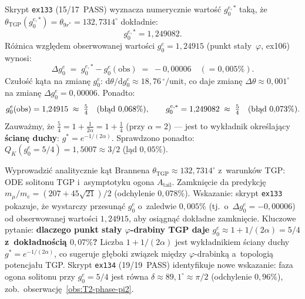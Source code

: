 \begin{observation}\label{obs:T2-top4-g0e-scan}
  Skrypt \texttt{ex133} (15/17~PASS) wyznacza numerycznie warto\'s\'c
  $g_0^{e,*}$ tak\k{a}, \.ze $\theta_{\mathrm{TGP}}(g_0^{e,*}) = \theta_{9r^*}
  = 132{,}7314^\circ$ dok\l{}adnie:
  \begin{equation}\label{eq:T2-g0e-star}
    g_0^{e,*} = 1{,}249082.
  \end{equation}
  R\'o\.znica wzgl\k{e}dem obserwowanej warto\'sci $g_0^e = 1{,}24915$
  (punkt stały~$\varphi$, ex106) wynosi:
  \begin{equation}
    \Delta g_0^e \;=\; g_0^{e,*} - g_0^e(\mathrm{obs}) \;=\; -0{,}00006
    \quad (= 0{,}005\%).
  \end{equation}
  Czu\l{}o\'s\'c k\k{a}ta na zmian\k{e} $g_0^e$:
  $\mathrm{d}\theta/\mathrm{d}g_0^e \approx 18{,}76\,{}^\circ/\mathrm{unit}$,
  co daje zmian\k{e} $\Delta\theta \approx 0{,}001^\circ$ na zmian\k{e}
  $\Delta g_0^e = 0{,}00006$.
  Ponadto:
  \begin{equation}\label{eq:T2-5-4}
    g_0^e(\mathrm{obs}) = 1{,}24915 \;\approx\; \tfrac{5}{4}
    \quad \text{(b\l\k{a}d } 0{,}068\%),
    \qquad
    g_0^{e,*} = 1{,}249082 \;\approx\; \tfrac{5}{4}
    \quad \text{(b\l\k{a}d } 0{,}073\%).
  \end{equation}
  Zauwa\.zmy, \.ze $\tfrac{5}{4} = 1 + \tfrac{1}{2\alpha} = 1 + \tfrac{1}{4}$
  (przy $\alpha=2$) --- jest to wyk\l{}adnik okre\'slaj\k{a}cy \textbf{\'scian\k{e}
  duchy}: $g^* = e^{-1/(2\alpha)}$.
  Sprawdzono ponadto: $Q_K(g_0^e = 5/4) = 1{,}5007 \approx 3/2$ (\b{l}\k{a}d
  $0{,}05\%$).
\end{observation}

\begin{openproblem}[T-OP4]\label{op:T2-top4}
  Wyprowadzi\'c analitycznie k\k{a}t Brannena
  $\theta_{\mathrm{TGP}} \approx 132{,}7314^\circ$
  z~warunk\'ow TGP: ODE solitonu TGP
  i~asymptotyku ogona $A_{\mathrm{tail}}$.
  Zamkni\k{e}cie da predykcj\k{e}
  $m_\mu/m_e = (207+45\sqrt{21})/2$ (od\-chylenie $0{,}078\%$).
  Wskazanie: skrypt \texttt{ex133} pokazuje, \.ze wystarczy
  przesun\k{a}\'c $g_0^e$ o~zaledwie $0{,}005\%$ (tj.\ o~$\Delta g_0^e =
  -0{,}00006$) od obserwowanej warto\'sci $1{,}24915$, aby osi\k{a}gn\k{a}\'c
  dok\l{}adne zamkni\k{e}cie.
  Kluczowe pytanie: \textbf{dlaczego punkt sta\l{}y $\varphi$-drabiny TGP
  daje $g_0^e \approx 1 + 1/(2\alpha) = 5/4$ z~dok\l{}adno\'sci\k{a} $0{,}07\%$?}
  Liczba $1 + 1/(2\alpha)$ jest wyk\l{}adnikiem \'sciany duchy
  $g^* = e^{-1/(2\alpha)}$, co sugeruje g\l{}\k{e}boki
  zwi\k{a}zek mi\k{e}dzy $\varphi$-drabink\k{a} a~topologi\k{a} potencja\l{}u
  TGP.
  Skrypt \texttt{ex134} (19/19~PASS) identyfikuje nowe wskazanie:
  faza ogona solitonu przy $g_0^e = 5/4$ jest r\'owna $\delta \approx 89{,}1^\circ
  \approx \pi/2$ (odchylenie $0{,}96\%$), zob.\ obserwacj\k{e}~\ref{obs:T2-phase-pi2}.
\end{openproblem}

